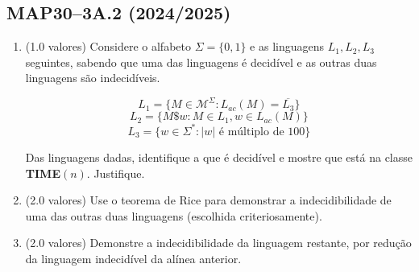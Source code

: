 \documentclass[a4paper,12pt]{article}
\begin{document}
\subsection*{MAP30–3A.2 (2024/2025)}
\begin{enumerate}[label=\alph*)]
  \item (1.0 valores) Considere o alfabeto \(\Sigma = \{0, 1\}\) e as linguagens \(L_1, L_2, L_3\) seguintes, sabendo que uma das linguagens é decidível e as outras duas linguagens são indecidíveis.

  \[L_1 = \{M \in \mathcal{M}^\Sigma : L_{ac}(M) = \overline{L_3}\}\]
  \[L_2 = \{M \$ w : M \in L_1, w \in L_{ac}(M)\}\]
  \[L_3 = \{w \in \Sigma^* : |w| \text{ é múltiplo de } 100\}\]
  
  Das linguagens dadas, identifique a que é decidível e mostre que está na classe \textbf{TIME}\((n)\). Justifique.

  \item (2.0 valores) Use o teorema de Rice para demonstrar a indecidibilidade de uma das outras duas linguagens (escolhida criteriosamente).

  \item (2.0 valores) Demonstre a indecidibilidade da linguagem restante, por redução da linguagem indecidível da alínea anterior.
\end{enumerate}
\end{document}
